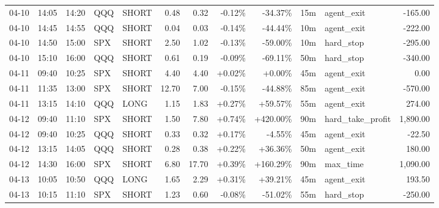 \documentclass[11pt,a4paper,twoside]{article}
\begin{document}
\begin{center}
\begin{longtable}{>{\color{txtmain}}l l l l l r r r r r >{\color{txtmain}}l r}
04-10 & 14:05 & 14:20 & QQQ & SHORT & 0.48 & 0.32 & \textcolor{lossred}{-0.12\%} & \textcolor{lossred}{-34.37\%} & 15m & agent\_exit & \textcolor{lossred}{-165.00} \\
04-10 & 14:45 & 14:55 & QQQ & SHORT & 0.04 & 0.03 & \textcolor{lossred}{-0.14\%} & \textcolor{lossred}{-44.44\%} & 10m & agent\_exit & \textcolor{lossred}{-222.00} \\
04-10 & 14:50 & 15:00 & SPX & SHORT & 2.50 & 1.02 & \textcolor{lossred}{-0.13\%} & \textcolor{lossred}{-59.00\%} & 10m & hard\_stop & \textcolor{lossred}{-295.00} \\
04-10 & 15:10 & 16:00 & QQQ & SHORT & 0.61 & 0.19 & \textcolor{lossred}{-0.09\%} & \textcolor{lossred}{-69.11\%} & 50m & hard\_stop & \textcolor{lossred}{-340.00} \\
04-11 & 09:40 & 10:25 & SPX & SHORT & 4.40 & 4.40 & \textcolor{wingreen}{+0.02\%} & \textcolor{wingreen}{+0.00\%} & 45m & agent\_exit & \textcolor{wingreen}{0.00} \\
04-11 & 11:35 & 13:00 & SPX & SHORT & 12.70 & 7.00 & \textcolor{lossred}{-0.15\%} & \textcolor{lossred}{-44.88\%} & 85m & agent\_exit & \textcolor{lossred}{-570.00} \\
04-11 & 13:15 & 14:10 & QQQ & LONG & 1.15 & 1.83 & \textcolor{wingreen}{+0.27\%} & \textcolor{wingreen}{+59.57\%} & 55m & agent\_exit & \textcolor{wingreen}{274.00} \\
04-12 & 09:40 & 11:10 & SPX & SHORT & 1.50 & 7.80 & \textcolor{wingreen}{+0.74\%} & \textcolor{wingreen}{+420.00\%} & 90m & hard\_take\_profit & \textcolor{wingreen}{1,890.00} \\
04-12 & 09:40 & 10:25 & QQQ & SHORT & 0.33 & 0.32 & \textcolor{wingreen}{+0.17\%} & \textcolor{lossred}{-4.55\%} & 45m & agent\_exit & \textcolor{lossred}{-22.50} \\
04-12 & 13:15 & 14:05 & QQQ & SHORT & 0.28 & 0.38 & \textcolor{wingreen}{+0.22\%} & \textcolor{wingreen}{+36.36\%} & 50m & agent\_exit & \textcolor{wingreen}{180.00} \\
04-12 & 14:30 & 16:00 & SPX & SHORT & 6.80 & 17.70 & \textcolor{wingreen}{+0.39\%} & \textcolor{wingreen}{+160.29\%} & 90m & max\_time & \textcolor{wingreen}{1,090.00} \\
04-13 & 10:05 & 10:50 & QQQ & LONG & 1.65 & 2.29 & \textcolor{wingreen}{+0.31\%} & \textcolor{wingreen}{+39.21\%} & 45m & agent\_exit & \textcolor{wingreen}{193.50} \\
04-13 & 10:15 & 11:10 & SPX & SHORT & 1.23 & 0.60 & \textcolor{lossred}{-0.08\%} & \textcolor{lossred}{-51.02\%} & 55m & hard\_stop & \textcolor{lossred}{-250.00} \\

\end{longtable}
\end{center}
\end{document}
